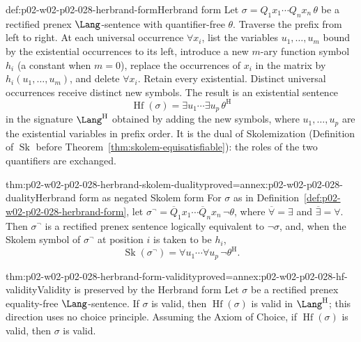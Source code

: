 \begin{hbdefinition}{def:p02-w02-p02-028-herbrand-form}{Herbrand form}
Let \(\sigma=Q_1x_1\cdots Q_nx_n\,\theta\) be a rectified prenex
\(\Lang\)-sentence with quantifier-free \(\theta\).  Traverse the prefix from
left to right.  At each universal occurrence \(\forall x_i\), list the
variables \(u_1,\ldots,u_m\) bound by the existential occurrences to its
left, introduce a new \(m\)-ary function symbol \(h_i\) (a constant when
\(m=0\)), replace the occurrences of \(x_i\) in the matrix by
\(h_i(u_1,\ldots,u_m)\), and delete \(\forall x_i\).  Retain every
existential.  Distinct universal occurrences receive distinct new symbols.
The result is an existential sentence
\[
  \operatorname{Hf}(\sigma)=\exists u_1\cdots\exists u_p\,\theta^{\mathrm H}
\]
in the signature \(\Lang^{\mathrm H}\) obtained by adding the new symbols,
where \(u_1,\ldots,u_p\) are the existential variables in prefix order.  It is
the dual of Skolemization (Definition of \(\operatorname{Sk}\) before
Theorem~\ref{thm:skolem-equisatisfiable}): the roles of the two quantifiers
are exchanged.
\end{hbdefinition}

\begin{hblemma}{thm:p02-w02-p02-028-herbrand-skolem-duality}{proved=annex:p02-w02-p02-028-duality}{Herbrand form as negated Skolem form}
For \(\sigma\) as in Definition~\ref{def:p02-w02-p02-028-herbrand-form}, let
\(\sigma^{\neg}=\overline{Q}_1x_1\cdots\overline{Q}_nx_n\,\neg\theta\), where
\(\overline{\forall}=\exists\) and \(\overline{\exists}=\forall\).  Then
\(\sigma^{\neg}\) is a rectified prenex sentence logically equivalent to
\(\neg\sigma\), and, when the Skolem symbol of \(\sigma^{\neg}\) at position
\(i\) is taken to be \(h_i\),
\[
 \operatorname{Sk}(\sigma^{\neg})=\forall u_1\cdots\forall u_p\,\neg\theta^{\mathrm H}.
\]
\end{hblemma}

\begin{hbtheorem}{thm:p02-w02-p02-028-herbrand-form-validity}{proved=annex:p02-w02-p02-028-hf-validity}{Validity is preserved by the Herbrand form}
Let \(\sigma\) be a rectified prenex equality-free \(\Lang\)-sentence.  If
\(\sigma\) is valid, then \(\operatorname{Hf}(\sigma)\) is valid in
\(\Lang^{\mathrm H}\); this direction uses no choice principle.  Assuming the
Axiom of Choice, if \(\operatorname{Hf}(\sigma)\) is valid, then \(\sigma\) is
valid.
\end{hbtheorem}

